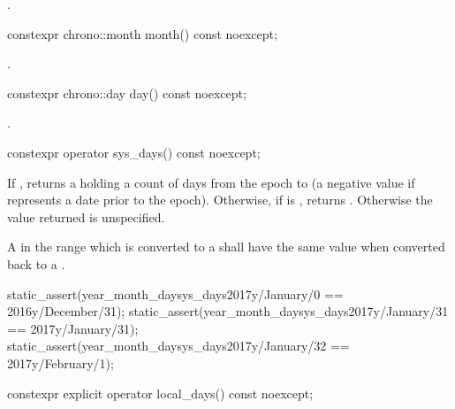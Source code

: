 \begin{itemdescr}
\pnum
\returns
{}.
\end{itemdescr}

%
\begin{itemdecl}
constexpr chrono::month month() const noexcept;
\end{itemdecl}

\begin{itemdescr}
\pnum
\returns
{}.
\end{itemdescr}

%
\begin{itemdecl}
constexpr chrono::day day() const noexcept;
\end{itemdecl}

\begin{itemdescr}
\pnum
\returns
{}.
\end{itemdescr}

%
\begin{itemdecl}
constexpr operator sys_days() const noexcept;
\end{itemdecl}

\begin{itemdescr}
\pnum
\returns
If ,
returns a 
holding a count of days from the  epoch to 
(a negative value if  represents a date prior to the  epoch).
Otherwise, if  is ,
returns .
Otherwise the value returned is unspecified.

\pnum
\remarks
A  in the range 
which is converted to a 
shall have the same value when converted back to a .

\pnum
\begin{example}
\begin{codeblock}
static_assert(year_month_day{sys_days{2017y/January/0}}  == 2016y/December/31);
static_assert(year_month_day{sys_days{2017y/January/31}} == 2017y/January/31);
static_assert(year_month_day{sys_days{2017y/January/32}} == 2017y/February/1);
\end{codeblock}
\end{example}
\end{itemdescr}

%
\begin{itemdecl}
constexpr explicit operator local_days() const noexcept;
\end{itemdecl}

